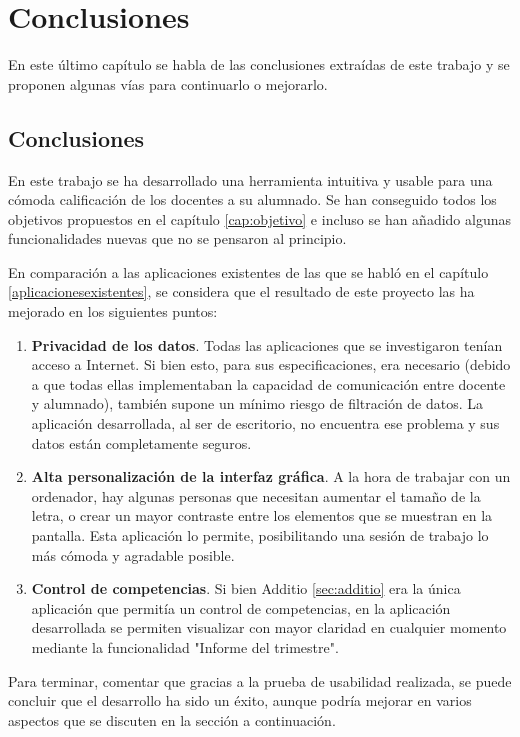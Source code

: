 \chapter{Conclusiones}
\label{cap:conclusiones}
En este último capítulo se habla de las conclusiones extraídas de este trabajo y se proponen algunas vías para continuarlo o mejorarlo.

\section{Conclusiones}
En este trabajo se ha desarrollado una herramienta intuitiva y usable para una cómoda calificación de los docentes a su alumnado. Se han conseguido todos los objetivos propuestos en el capítulo \ref{cap:objetivo} e incluso se han añadido algunas funcionalidades nuevas que no se pensaron al principio.

En comparación a las aplicaciones existentes de las que se habló en el capítulo \ref{aplicacionesexistentes}, se considera que el resultado de este proyecto las ha mejorado en los siguientes puntos:
\begin{enumerate}
	\item \textbf{Privacidad de los datos}. Todas las aplicaciones que se investigaron tenían acceso a Internet. Si bien esto, para sus especificaciones, era necesario (debido a que todas ellas implementaban la capacidad de comunicación entre docente y alumnado), también supone un mínimo riesgo de filtración de datos. La aplicación desarrollada, al ser de escritorio, no encuentra ese problema y sus datos están completamente seguros.
	\item \textbf{Alta personalización de la interfaz gráfica}. A la hora de trabajar con un ordenador, hay algunas personas que necesitan aumentar el tamaño de la letra, o crear un mayor contraste entre los elementos que se muestran en la pantalla. Esta aplicación lo permite, posibilitando una sesión de trabajo lo más cómoda y agradable posible.
	\item \textbf{Control de competencias}. Si bien Additio \ref{sec:additio} era la única aplicación que permitía un control de competencias, en la aplicación desarrollada se permiten visualizar con mayor claridad en cualquier momento mediante la funcionalidad "Informe del trimestre".
\end{enumerate}

Para terminar, comentar que gracias a la prueba de usabilidad realizada, se puede concluir que el desarrollo ha sido un éxito, aunque podría mejorar en varios aspectos que se discuten en la sección a continuación.
	


